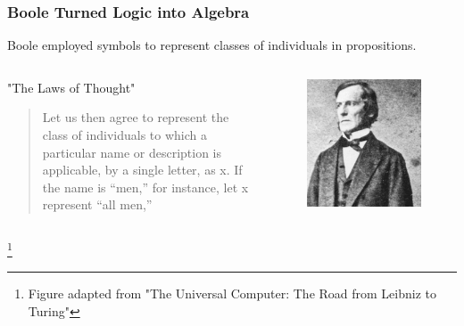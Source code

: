 \documentclass[unicode, 14pt, aspectratio=169]{beamer}
\newcommand\blfootnote[1]{%
  \begingroup
  \renewcommand\thefootnote{}\footnote{#1}%
  \addtocounter{footnote}{-1}%
  \endgroup
}
\begin{document}
\begin{frame}
  \frametitle{Boole Turned Logic into Algebra}
  {\large Boole employed symbols to represent classes of individuals in propositions.}
  \begin{columns}
    \begin{column}{0.7\textwidth}
      \begin{center}
        "The Laws of Thought"\supercite{bool}
        \begin{quotation}
          Let us then agree to represent the class of individuals to which a particular name or description is applicable, by a single letter, as x. If the name is “men,” for instance, let x represent “all men,”
        \end{quotation}
      \end{center}
    \end{column}    
    \begin{column}{0.2\textwidth}
      \begin{figure}
        \includegraphics[width=1\textwidth]{images/bool.png}
      \end{figure}       
    \end{column} 
  \end{columns}
  \blfootnote{Figure adapted from "The Universal Computer: The Road from Leibniz to Turing"}
\end{frame}
\end{document}
